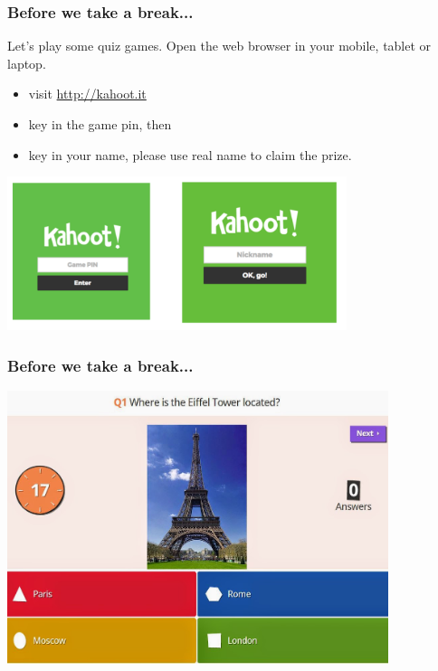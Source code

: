 \documentclass{beamer}
\begin{document}
\begin{frame}[fragile]
\frametitle{Before we take a break...}
Let's play some quiz games. Open the web browser in your mobile, tablet or laptop.
\begin{itemize}
\item visit \url{http://kahoot.it}
\item key in the game pin, then
\item key in your name, please use real name to claim the prize.
\end{itemize}
\includegraphics[height=4.5cm]{pics/kahoot_login.png}
\end{frame}

\begin{frame}[fragile]
\frametitle{Before we take a break...}

\includegraphics[height=8cm]{pics/kahoot.png}
\end{frame}
\end{document}
